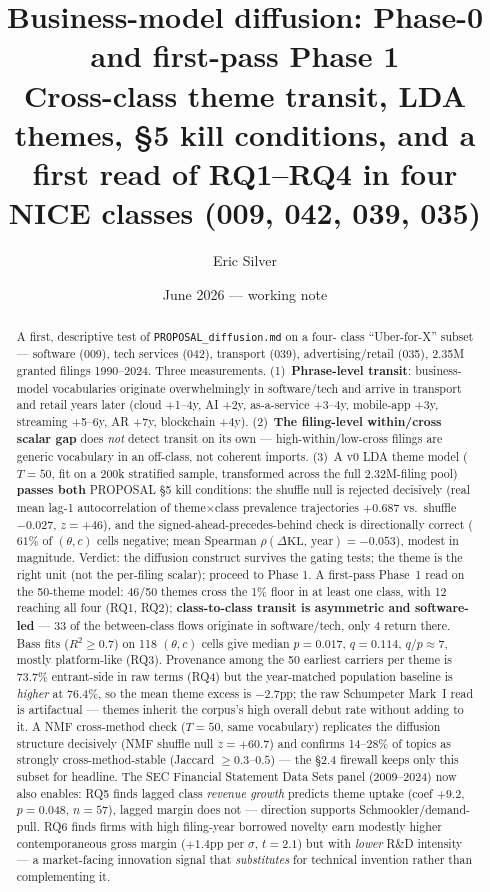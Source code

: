 \documentclass[11pt]{article}
\title{\bfseries Business-model diffusion: Phase-0 and first-pass Phase 1\\
\large Cross-class theme transit, LDA themes, §5 kill conditions, and a first read of RQ1--RQ4 in four NICE classes (009, 042, 039, 035)}
\author{Eric Silver}
\date{June 2026 --- working note}
\begin{document}
\maketitle

\begin{abstract}
\noindent A first, descriptive test of \texttt{PROPOSAL\_diffusion.md} on a four-
class ``Uber-for-X'' subset --- software (009), tech services (042), transport
(039), advertising/retail (035), 2.35M granted filings 1990--2024. Three
measurements. (1)~\textbf{Phrase-level transit}: business-model vocabularies
originate overwhelmingly in software/tech and arrive in transport and retail
years later (cloud +1--4y, AI +2y, as-a-service +3--4y, mobile-app +3y,
streaming +5--6y, AR +7y, blockchain +4y). (2)~\textbf{The filing-level
within/cross scalar gap} does \emph{not} detect transit on its own ---
high-within/low-cross filings are generic vocabulary in an off-class, not
coherent imports. (3)~A v0 LDA theme model ($T=50$, fit on a 200k stratified
sample, transformed across the full 2.32M-filing pool) \textbf{passes both}
PROPOSAL §5 kill conditions: the shuffle null is rejected decisively (real
mean lag-1 autocorrelation of theme$\times$class prevalence trajectories
$+0.687$ vs.\ shuffle $-0.027$, $z=+46$), and the signed-ahead-precedes-behind
check is directionally correct ($61\%$ of $(\theta, c)$ cells negative; mean
Spearman $\rho(\Delta\mathrm{KL},\,\text{year}) = -0.053$), modest in
magnitude. Verdict: the diffusion construct survives the gating tests; the
theme is the right unit (not the per-filing scalar); proceed to Phase 1.
A first-pass Phase~1 read on the 50-theme model: 46/50 themes cross the 1\%
floor in at least one class, with 12 reaching all four (RQ1, RQ2);
\textbf{class-to-class transit is asymmetric and software-led} --- 33 of the
between-class flows originate in software/tech, only 4 return there. Bass fits
($R^2 \geq 0.7$) on 118 $(\theta, c)$ cells give median $p = 0.017$,
$q = 0.114$, $q/p \approx 7$, mostly platform-like (RQ3). Provenance among the
50 earliest carriers per theme is 73.7\% entrant-side in raw terms (RQ4) but
the year-matched population baseline is \emph{higher} at 76.4\%, so the mean
theme excess is $-2.7$pp; the raw Schumpeter Mark~I read is artifactual ---
themes inherit the corpus's high overall debut rate without adding to it. A NMF cross-method
check ($T=50$, same vocabulary) replicates the diffusion structure decisively
(NMF shuffle null $z=+60.7$) and confirms 14--28\% of topics as strongly
cross-method-stable (Jaccard $\geq 0.3$--$0.5$) --- the §2.4 firewall keeps only
this subset for headline. The SEC Financial Statement Data Sets panel
(2009--2024) now also enables: RQ5 finds lagged class \emph{revenue growth}
predicts theme uptake (coef $+9.2$, $p=0.048$, $n=57$), lagged margin does not
--- direction supports Schmookler/demand-pull. RQ6 finds firms with high
filing-year borrowed novelty earn modestly higher contemporaneous gross margin
($+1.4$pp per $\sigma$, $t=2.1$) but with \emph{lower} R\&D intensity --- a
market-facing innovation signal that \emph{substitutes} for technical
invention rather than complementing it.
\end{abstract}
\end{document}
